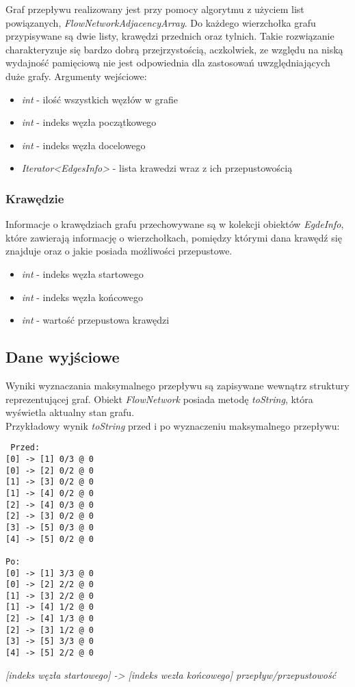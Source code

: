 \documentclass[10pt]{minutes}
\begin{document}
    Graf przepływu realizowany jest przy pomocy algorytmu z użyciem list powiązanych, \emph{FlowNetworkAdjacencyArray}. Do każdego wierzchołka grafu przypisywane są dwie listy,
 krawędzi przednich oraz tylnich. Takie rozwiązanie charakteryzuje się bardzo dobrą przejrzystością, aczkolwiek, ze względu na niską wydajność pamięciową nie jest odpowiednia dla zastosowań uwzględniających duże grafy.
Argumenty wejściowe:
    \begin{itemize}
      \item \emph{int} - ilość wszystkich węzłów w grafie
      \item \emph{int} - indeks węzła początkowego
      \item \emph{int} - indeks węzła docelowego
      \item \emph{Iterator<EdgesInfo>} - lista krawedzi wraz z ich przepustowością
    \end{itemize}

  \subsubsection{Krawędzie}
    Informacje o krawędziach grafu przechowywane są w kolekcji obiektów \emph{EgdeInfo}, które zawierają informację o wierzchołkach,
pomiędzy którymi dana krawędź się znajduje oraz o jakie posiada możliwości przepustowe.
    \begin{itemize}
      \item \emph{int} - indeks węzła startowego
      \item \emph{int} - indeks węzła końcowego
      \item \emph{int} - wartość przepustowa krawędzi
    \end{itemize}

  \subsection{Dane wyjściowe}
    Wyniki wyznaczania maksymalnego przepływu są zapisywane wewnątrz struktury reprezentującej graf. Obiekt \emph{FlowNetwork} posiada metodę \emph{toString}, która wyświetla aktualny stan grafu.\\
Przykładowy wynik \emph{toString} przed i po wyznaczeniu maksymalnego przepływu:
\begin{lstlisting}        
 Przed:
[0] -> [1] 0/3 @ 0
[0] -> [2] 0/2 @ 0
[1] -> [3] 0/2 @ 0
[1] -> [4] 0/2 @ 0
[2] -> [4] 0/3 @ 0
[2] -> [3] 0/2 @ 0
[3] -> [5] 0/3 @ 0
[4] -> [5] 0/2 @ 0

Po:
[0] -> [1] 3/3 @ 0
[0] -> [2] 2/2 @ 0
[1] -> [3] 2/2 @ 0
[1] -> [4] 1/2 @ 0
[2] -> [4] 1/3 @ 0
[2] -> [3] 1/2 @ 0
[3] -> [5] 3/3 @ 0
[4] -> [5] 2/2 @ 0
\end{lstlisting}
\emph{[indeks węzła startowego] -> [indeks wezła końcowego] przepływ/przepustowość}
\end{document}
